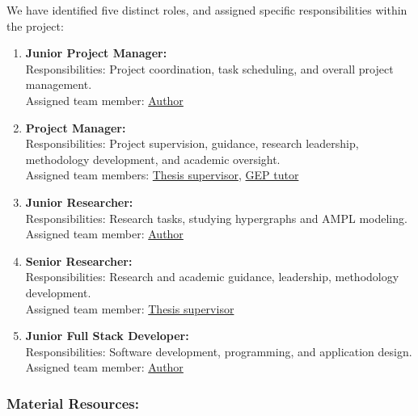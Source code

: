 We have identified five distinct roles, and assigned specific responsibilities within the project:

\begin{enumerate}
    \item \textbf{Junior Project Manager:}\\
    Responsibilities: Project coordination, task scheduling, and overall project management.\\
    Assigned team member: \hyperlink{ht:author}{Author}
    \item \textbf{Project Manager:}\\
    Responsibilities: Project supervision, guidance, research leadership, methodology development, and academic oversight.\\
    Assigned team members: \hyperlink{ht:supervisor}{Thesis supervisor}, \hyperlink{ht:GEPtutor}{GEP tutor}
    \item \textbf{Junior Researcher:}\\
    Responsibilities: Research tasks, studying hypergraphs and AMPL modeling.\\
    Assigned team member: \hyperlink{ht:author}{Author}
    \item \textbf{Senior Researcher:}\\
    Responsibilities: Research and academic guidance, leadership, methodology development.\\
    Assigned team member: \hyperlink{ht:supervisor}{Thesis supervisor}
    \item \textbf{Junior Full Stack Developer:}\\
    Responsibilities: Software development, programming, and application design.\\
    Assigned team member: \hyperlink{ht:author}{Author}
\end{enumerate}

\subsubsection{Material Resources:}\label{sec:material_resources}

